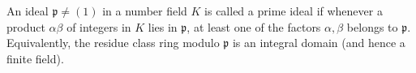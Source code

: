 An ideal $\mathfrak{p} \neq (1)$ in a number field $K$ is called a prime ideal if whenever a product $\alpha\beta$ of integers in $K$ lies in $\mathfrak{p}$, at least one of the factors $\alpha, \beta$ belongs to $\mathfrak{p}$. Equivalently, the residue class ring modulo $\mathfrak{p}$ is an integral domain (and hence a finite field).
